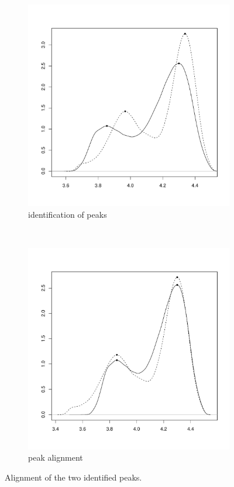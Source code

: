 \begin{figure}[ht]
\begin{subfigure}[b]{.5\textwidth}
\centering
\includegraphics[scale=.4]{figures/normalisation-peaks-a.pdf} 
\caption{identification of peaks}
\end{subfigure}
~
\begin{subfigure}[b]{.5\textwidth}
\centering
\includegraphics[scale=.4]{figures/normalisation-peaks-b.pdf} 
\caption{peak alignment}
\end{subfigure}
\caption{ \label{normalisation-peaks}
Alignment of the two identified peaks.
}
\end{figure}


